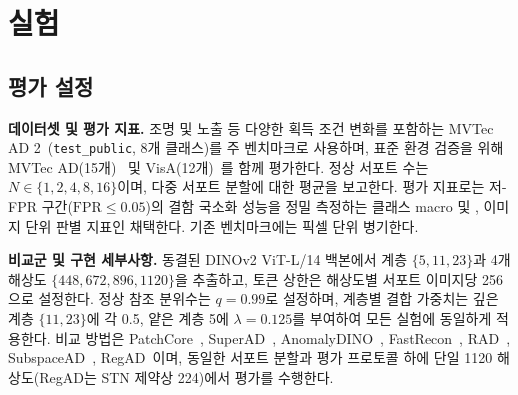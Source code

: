 \section{실험}
\label{sec:experiments}

\subsection{평가 설정}
\label{sec:experiments:setup}

\noindent\textbf{데이터셋 및 평가 지표.}
조명 및 노출 등 다양한 획득 조건 변화를 포함하는 MVTec AD 2~\cite{mvtecad2}(\texttt{test\_public}, 8개 클래스)를 주 벤치마크로 사용하며, 표준 환경 검증을 위해 MVTec AD(15개)~\cite{mvtecad} 및 VisA(12개)~\cite{visa}를 함께 평가한다.
정상 서포트 수는 $N \in \{1, 2, 4, 8, 16\}$이며, 다중 서포트 분할에 대한 평균을 보고한다.
평가 지표로는 저-FPR 구간($\mathrm{FPR} \le 0.05$)의 결함 국소화 성능을 정밀 측정하는 클래스 macro \AUPRO 및 , 이미지 단위 판별 지표인  채택한다. 기존 벤치마크에는 픽셀 단위  병기한다.

\noindent\textbf{비교군 및 구현 세부사항.}
동결된 DINOv2 ViT-L/14 백본에서 계층 $\{5, 11, 23\}$과 4개 해상도 $\{448, 672, 896, 1120\}$을 추출하고, 토큰 상한은 해상도별 서포트 이미지당 256으로 설정한다.
정상 참조 분위수는 $q=0.99$로 설정하며, 계층별 결합 가중치는 깊은 계층 $\{11, 23\}$에 각 0.5, 얕은 계층 5에 $\lambda=0.125$를 부여하여 모든 실험에 동일하게 적용한다.
비교 방법은 PatchCore~\cite{patchcore}, SuperAD~\cite{superad}, AnomalyDINO~\cite{anomalydino}, FastRecon~\cite{fastrecon}, RAD~\cite{rad}, SubspaceAD~\cite{subspacead}, RegAD~\cite{regad}이며, 동일한 서포트 분할과 평가 프로토콜 하에 단일 1120 해상도(RegAD는 STN 제약상 224)에서 평가를 수행한다.



